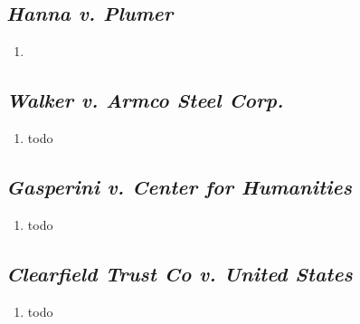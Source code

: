 \subsection{\emph{Hanna v. Plumer}}

\begin{enumerate}
    \item 
\end{enumerate}



\subsection{\emph{Walker v. Armco Steel Corp.}}

\begin{enumerate}
    \item todo
\end{enumerate}

\subsection{\emph{Gasperini v. Center for Humanities}}

\begin{enumerate}
    \item todo
\end{enumerate}

\subsection{\emph{Clearfield Trust Co v. United States}}

\begin{enumerate}
    \item todo
\end{enumerate}

